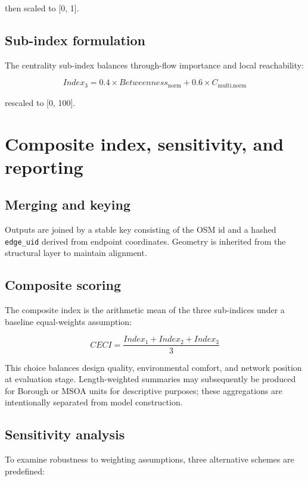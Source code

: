 \documentclass[
  12pt,
  oneside]{book}
\begin{document}
then scaled to {[}0, 1{]}.

\subsection{Sub-index formulation}\label{sub-index-formulation-1}

The centrality sub-index balances through-flow importance and local reachability:

\[Index_{3} = 0.4 \times Betweenness_{\text{norm}} + 0.6 \times C_{\text{multi,norm}}\]

rescaled to {[}0, 100{]}.

\section{Composite index, sensitivity, and reporting}\label{composite-index-sensitivity-and-reporting}

\subsection{Merging and keying}\label{merging-and-keying}

Outputs are joined by a stable key consisting of the OSM id and a hashed \texttt{edge\_uid} derived from endpoint coordinates. Geometry is inherited from the structural layer to maintain alignment.

\subsection{Composite scoring}\label{composite-scoring}

The composite index is the arithmetic mean of the three sub-indices under a baseline equal-weights assumption:

\[CECI = \frac{Index_{1} + Index_{2} + Index_{3}}{3}\]

This choice balances design quality, environmental comfort, and network position at evaluation stage. Length-weighted summaries may subsequently be produced for Borough or MSOA units for descriptive purposes; these aggregations are intentionally separated from model construction.

\subsection{Sensitivity analysis}\label{sensitivity-analysis}

To examine robustness to weighting assumptions, three alternative schemes are predefined:
\end{document}
